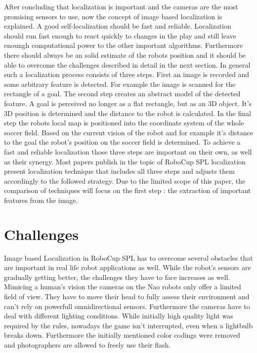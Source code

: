 \documentclass[12pt, a4paper]{scrartcl}
\begin{document}
  After concluding that localization is important and the cameras are the most promising sensors to use, now the concept of image based localization is explained. A good self-localization should be fast and reliable. Localization should run fast enough to react quickly to changes in the play and still leave enoungh computational power to the other important algorithms. Furthermore there should always be an solid estimate of the robots position and it should be able to overcome the challenges described in detail in the next section. In general such a localization process consists of three steps. First an image is recorded and some arbitrary feature is detected. For example the image is scanned for the rectangle of a goal. The second step creates an abstract model of the detected feature. A goal is perceived no longer as a flat rectangle, but as an 3D object. It's 3D position is determined and the distance to the robot is calculated. In the final step the robots local map is positioned into the coordinate system of the whole soccer field. Based on the current vision of the robot and for example it's distance to the goal the robot's position on the soccer field is determined. To achieve a fast and reliable localization those three steps are important on their own, as well as their synergy. Most papers publish in the topic of RoboCup SPL localization present localization technique that includes all three steps and adjusts them accordingly to the followed strategy. Due to the limited scope of this paper, the comparison of techniques will focus on the first step : the extraction of important features from the image.

  \section{Challenges}
  Image based Localization in RoboCup SPL has to overcome several obstacles that are important in real life robot applications as well. While the robot's sensors are gradually getting better, the challenges they have to face increases as well. Mimicing a human's vision the cameras on the Nao robots only offer a limited field of view. They have to move their head to fully assess their environment and can't rely on powerfull omnidirectional sensors. Furthermore the cameras have to deal with different lighting conditions. While initially high quality light was required by the rules, nowadays the game isn't interrupted, even when a lightbulb breaks down. Furthermore the initially mentioned color codings were removed and photographers are allowed to freely use their flash.
\end{document}
